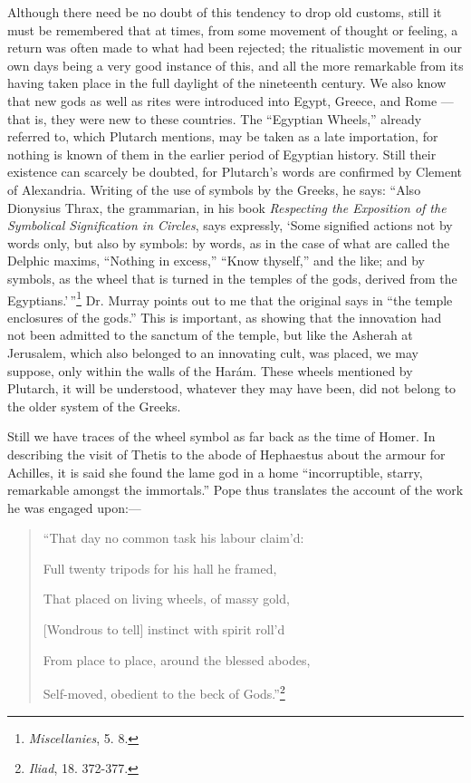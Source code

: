 \documentclass[a4paper, 11pt, oneside, polutonikogreek, english]{article}
\begin{document}
Although there need be no doubt of this tendency to drop old customs, still it must be remembered that at times, from some movement of thought or feeling, a return was often made to what had been rejected; the ritualistic movement in our own days being a very good instance of this, and all the more remarkable from its having taken place in the full daylight of the nineteenth century. We also know that new gods as well as rites were introduced into Egypt, Greece, and Rome --- that is, they were new to these countries. The ``Egyptian Wheels,'' already referred to, which Plutarch mentions, may be taken as a late importation, for nothing is known of them in the earlier period of Egyptian history. Still their existence can scarcely be doubted, for Plutarch's words are confirmed by Clement of Alexandria. Writing of the use of symbols by the Greeks, he says: ``Also Dionysius Thrax, the grammarian, in his book \emph{Respecting the Exposition of the Symbolical Signification in Circles}, says expressly, `Some signified actions not by words only, but also by symbols: by words, as in the case of what are called the Delphic maxims, ``Nothing in excess,'' ``Know thyself,'' and the like; and by symbols, as the wheel that is turned in the temples of the gods, derived from the Egyptians.'\,''\footnote{\emph{Miscellanies}, 5. 8.} Dr. Murray points out to me that the original says in ``the temple enclosures of the gods.'' This is important, as showing that the innovation had not been admitted to the sanctum of the temple, but like the Asherah at Jerusalem, which also belonged to an innovating cult, was placed, we may suppose, only within the walls of the Harám. These wheels mentioned by Plutarch, it will be understood, whatever they may have been, did not belong to the older system of the Greeks.

Still we have traces of the wheel symbol as far back as the time of Homer. In describing the visit of Thetis to the abode of Hephaestus about the armour for Achilles, it is said she found the lame god in a home ``incorruptible, starry, remarkable amongst the immortals.'' Pope thus translates the account of the work he was engaged upon:---

\begin{quotation}\small
``That day no common task his labour claim'd:

Full twenty tripods for his hall he framed,

That placed on living wheels, of massy gold,

[Wondrous to tell] instinct with spirit roll'd

From place to place, around the blessed abodes,

Self-moved, obedient to the beck of Gods.''\footnote{\emph{Iliad}, 18. 372-377.}
\end{quotation}
\end{document}
